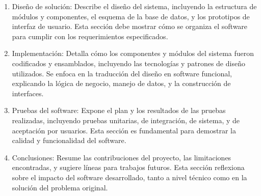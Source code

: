 \begin{enumerate}
    \item Diseño de solución: Describe el diseño del sistema, incluyendo la estructura de módulos y componentes, el esquema de la base de datos, y los prototipos de interfaz de usuario. Esta sección debe mostrar cómo se organiza el software para cumplir con los requerimientos especificados. 
    \item Implementación: Detalla cómo los componentes y módulos del sistema fueron codificados y ensamblados, incluyendo las tecnologías y patrones de diseño utilizados. Se enfoca en la traducción del diseño en software funcional, explicando la lógica de negocio, manejo de datos, y la construcción de interfaces.
    \item Pruebas del software: Expone el plan y los resultados de las pruebas realizadas, incluyendo pruebas unitarias, de integración, de sistema, y de aceptación por usuarios. Esta sección es fundamental para demostrar la calidad y funcionalidad del software.
    \item Conclusiones: Resume las contribuciones del proyecto, las limitaciones encontradas, y sugiere líneas para trabajos futuros. Esta sección reflexiona sobre el impacto del software desarrollado, tanto a nivel técnico como en la solución del problema original. 
\end{enumerate}